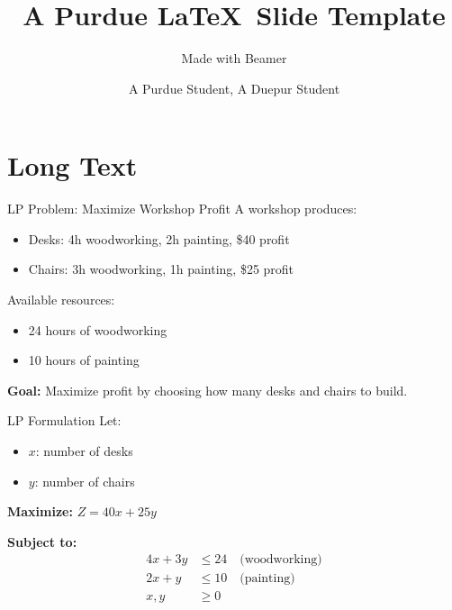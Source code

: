 \documentclass{purdue-slide}
\title{A Purdue \LaTeX\ Slide Template}
\subtitle{Made with Beamer}
\author{A Purdue Student\texorpdfstring{\footnotemark[1]}{}, A Duepur Student\texorpdfstring{\footnotemark[2]}{}}
\begin{document}
\begin{titleframe}{}
    \maketitle
\end{titleframe}

\section{Long Text}

\begin{frame}{LP Problem: Maximize Workshop Profit}
    A workshop produces:
    \begin{itemize}
        \item Desks: 4h woodworking, 2h painting, \$40 profit
        \item Chairs: 3h woodworking, 1h painting, \$25 profit
    \end{itemize}

    Available resources:
    \begin{itemize}
        \item 24 hours of woodworking
        \item 10 hours of painting
    \end{itemize}

    \textbf{Goal:} Maximize profit by choosing how many desks and chairs to build.
\end{frame}

\begin{frame}{LP Formulation}
    Let:
    \begin{itemize}
        \item \(x\): number of desks
        \item \(y\): number of chairs
    \end{itemize}

    \textbf{Maximize: } \(Z = 40x + 25y\)

    \textbf{Subject to:}
    \[
    \begin{aligned}
    4x + 3y &\leq 24 \quad \text{(woodworking)} \\
    2x + y &\leq 10 \quad \text{(painting)} \\
    x, y &\geq 0
    \end{aligned}
    \]
\end{frame}
\end{document}
